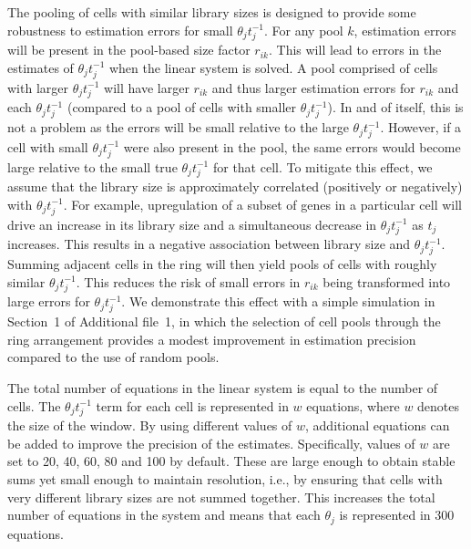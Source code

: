 \documentclass{bmcart}
\newcommand{\supppoolsim}{1}
\newcommand{\revised}[1]{#1}
\begin{document}
The pooling of cells with similar library sizes is designed to provide some robustness to estimation errors for small $\theta_j t_j^{-1}$.
For any pool $k$, estimation errors will be present in the pool-based size factor $r_{ik}$.
This will lead to errors in the estimates of $\theta_j t_j^{-1}$ when the linear system is solved.
A pool comprised of cells with larger $\theta_j t_j^{-1}$ will have larger $r_{ik}$ and thus larger estimation errors for $r_{ik}$ and each $\theta_j t_j^{-1}$ (compared to a pool of cells with smaller $\theta_j t_j^{-1}$).
In and of itself, this is not a problem as the errors will be small relative to the large $\theta_j t_j^{-1}$.
However, if a cell with small $\theta_j t_j^{-1}$ were also present in the pool, the same errors would become large relative to the small true $\theta_j t_j^{-1}$ for that cell.
To mitigate this effect, we assume that the library size is approximately correlated (positively or negatively) with $\theta_j t_j^{-1}$.
For example, upregulation of a subset of genes in a particular cell will drive an increase in its library size and a simultaneous decrease in $\theta_j t_j^{-1}$ as $t_j$ increases.
This results in a negative association between library size and $\theta_j t_j^{-1}$.
Summing adjacent cells in the ring will then yield pools of cells with roughly similar $\theta_j t_j^{-1}$.
This reduces the risk of small errors in $r_{ik}$ being transformed into large errors for $\theta_j t_j^{-1}$.
\revised{We demonstrate this effect with a simple simulation in Section~\supppoolsim{} of Additional file~1, in which the selection of cell pools through the ring arrangement provides a modest improvement in estimation precision compared to the use of random pools.}

The total number of equations in the linear system is equal to the number of cells.
The $\theta_jt_j^{-1}$ term for each cell is represented in $w$ equations, where $w$ denotes the size of the window.
By using different values of $w$, additional equations can be added to improve the precision of the estimates. 
Specifically, values of $w$ are set to 20, 40, 60, 80 and 100 by default.
These are large enough to obtain stable sums yet small enough to maintain resolution, i.e., by ensuring that cells with very different library sizes are not summed together.
This increases the total number of equations in the system and means that each $\theta_j$ is represented in 300 equations. 
\end{document}
